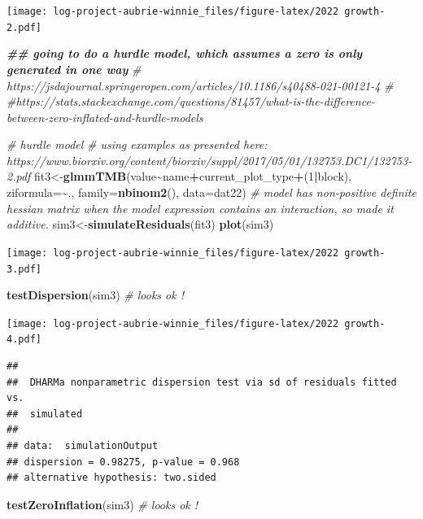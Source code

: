 \documentclass[
]{article}
\newenvironment{Shaded}{\begin{snugshade}}{\end{snugshade}}
\newcommand{\AttributeTok}[1]{\textcolor[rgb]{0.13,0.29,0.53}{#1}}
\newcommand{\CommentTok}[1]{\textcolor[rgb]{0.56,0.35,0.01}{\textit{#1}}}
\newcommand{\DecValTok}[1]{\textcolor[rgb]{0.00,0.00,0.81}{#1}}
\newcommand{\DocumentationTok}[1]{\textcolor[rgb]{0.56,0.35,0.01}{\textbf{\textit{#1}}}}
\newcommand{\FunctionTok}[1]{\textcolor[rgb]{0.13,0.29,0.53}{\textbf{#1}}}
\newcommand{\NormalTok}[1]{#1}
\newcommand{\OtherTok}[1]{\textcolor[rgb]{0.56,0.35,0.01}{#1}}
\newcommand{\SpecialCharTok}[1]{\textcolor[rgb]{0.81,0.36,0.00}{\textbf{#1}}}
\begin{document}
\texttt{[image: log-project-aubrie-winnie\_files/figure-latex/2022 growth-2.pdf]}

\begin{Shaded}
\begin{Highlighting}[]
\DocumentationTok{\#\# going to do a hurdle model, which assumes a zero is only generated in one way }
\CommentTok{\# https://jsdajournal.springeropen.com/articles/10.1186/s40488{-}021{-}00121{-}4}
\CommentTok{\# \#https://stats.stackexchange.com/questions/81457/what{-}is{-}the{-}difference{-}between{-}zero{-}inflated{-}and{-}hurdle{-}models}

\CommentTok{\# hurdle model }
\CommentTok{\# using examples as presented here: https://www.biorxiv.org/content/biorxiv/suppl/2017/05/01/132753.DC1/132753{-}2.pdf }
\NormalTok{fit3}\OtherTok{\textless{}{-}}\FunctionTok{glmmTMB}\NormalTok{(value}\SpecialCharTok{\textasciitilde{}}\NormalTok{name}\SpecialCharTok{+}\NormalTok{current\_plot\_type}\SpecialCharTok{+}\NormalTok{(}\DecValTok{1}\SpecialCharTok{|}\NormalTok{block), }\AttributeTok{ziformula=}\SpecialCharTok{\textasciitilde{}}\NormalTok{., }\AttributeTok{family=}\FunctionTok{nbinom2}\NormalTok{(), }\AttributeTok{data=}\NormalTok{dat22) }\CommentTok{\# model has non{-}positive definite hessian matrix when the model expression contains an interaction, so made it additive.}
\NormalTok{ sim3}\OtherTok{\textless{}{-}}\FunctionTok{simulateResiduals}\NormalTok{(fit3)}
 \FunctionTok{plot}\NormalTok{(sim3)}
\end{Highlighting}
\end{Shaded}

\texttt{[image: log-project-aubrie-winnie\_files/figure-latex/2022 growth-3.pdf]}

\begin{Shaded}
\begin{Highlighting}[]
 \FunctionTok{testDispersion}\NormalTok{(sim3) }\CommentTok{\# looks ok ! }
\end{Highlighting}
\end{Shaded}

\texttt{[image: log-project-aubrie-winnie\_files/figure-latex/2022 growth-4.pdf]}

\begin{verbatim}
## 
##  DHARMa nonparametric dispersion test via sd of residuals fitted vs.
##  simulated
## 
## data:  simulationOutput
## dispersion = 0.98275, p-value = 0.968
## alternative hypothesis: two.sided
\end{verbatim}

\begin{Shaded}
\begin{Highlighting}[]
 \FunctionTok{testZeroInflation}\NormalTok{(sim3) }\CommentTok{\# looks ok ! }
\end{Highlighting}
\end{Shaded}
\end{document}
